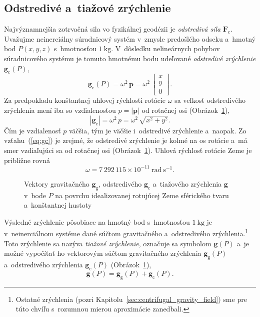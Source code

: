 \documentclass[a4paper, 12pt]{book}
\newcommand{\gidx}{\mathrm g}
\newcommand{\cidx}{\mathrm c}
\let\vec\mathbf
\begin{document}
\subsection{Odstredivé a~tiažové zrýchlenie}

Najvýznamnejšia zotrvačná sila vo fyzikálnej geodézii je \emph{odstredivá sila}
$\vec F_\cidx$.  Uvažujme neinerciálny súradnicový systém v~zmysle predošlého
odseku a~hmotný bod $P(x, y, z)$ s~hmotnosťou $1\ \mathrm{kg}$.  V~dôsledku
nelineárnych pohybov súradnicového systému je tomuto hmotnému bodu udeľované
\emph{odstredivé zrýchlenie} $\vec g_\cidx(P)$,
%
\begin{equation}
\label{eq:gc}
\vec g_\cidx(P) = \omega^2 \, \vec p =
%
\omega^2 \, \begin{bmatrix}
x\\
y\\
0
\end{bmatrix}
{.}
\end{equation}
%
Za predpokladu konštantnej uhlovej rýchlosti rotácie $\omega$ sa veľkosť
odstredivého zrýchlenia mení iba so vzdialenosťou $p = | \vec p |$ od rotačnej
osi (Obrázok~\ref{fig:gravity_vector}),
%
\begin{equation}
| \vec g_\cidx | = \omega^2 \, p = \omega^2 \, \sqrt{x^2 + y^2}{.}
\end{equation}
%
Čím je vzdialenosť $p$ väčšia, tým je väčšie i~odstredivé zrýchlenie a~naopak.
Zo vzťahu~(\ref{eq:gc}) je zrejmé, že odstredivé zrýchlenie je kolmé na os
rotácie a~má smer vzdiaľujúci sa od rotačnej osi
(Obrázok~\ref{fig:gravity_vector}).  Uhlová rýchlosť rotácie Zeme je približne
rovná \citep{GRS80}
%
\begin{equation}
\omega = 7\, 292\, 115 \times 10^{-11} \ \mathrm{rad} \ \mathrm{s}^{-1}{.}
\end{equation}

\begin{figure}
\centering

\caption{Vektory gravitačného $\vec g_\gidx$, odstredivého $\vec g_\cidx$
a~tiažového zrýchlenia $\vec g$ v~bode $P$ na povrchu idealizovanej rotujúcej
Zeme sférického tvaru a~konštantnej hustoty}
\label{fig:gravity_vector}
\end{figure}

Výsledné zrýchlenie pôsobiace na hmotný bod s~hmotnosťou $1 \ \mathrm{kg}$ je
v~neinerciálnom systéme dané súčtom gravitačného a~odstredivého
zrýchlenia.\footnote{Ostatné zrýchlenia (pozri
Kapitolu~\ref{sec:centrifugal_gravity_field}) sme pre túto chvíľu s~rozumnou
mierou aproximácie zanedbali.}  Toto zrýchlenie sa nazýva \emph{tiažové
zrýchlenie}, označuje sa symbolom $\vec g(P)$ a~je možné vypočítať ho
vektorovým súčtom gravitačného zrýchlenia $\vec g_\gidx(P)$ a~odstredivého
zrýchlenia $\vec g_\cidx(P)$ (Obrázok~\ref{fig:gravity_vector}),
%
\begin{equation}
\label{eq:g}
\vec g(P) = \vec g_\gidx(P) + \vec g_\cidx(P){.}
\end{equation}
\end{document}
